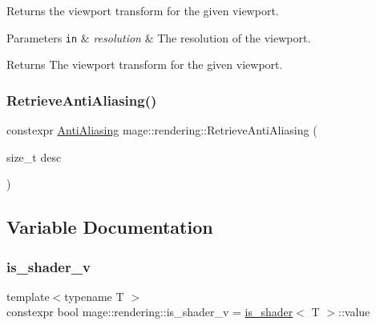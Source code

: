 Returns the viewport transform for the given viewport.


\begin{DoxyParams}[1]{Parameters}
\mbox{\tt in}  & {\em resolution} & The resolution of the viewport. \\
\hline
\end{DoxyParams}
\begin{DoxyReturn}{Returns}
The viewport transform for the given viewport. 
\end{DoxyReturn}
\mbox{\label{namespacemage_1_1rendering_a3e474e8647b074fb13425a24a8354b77}} 
\subsubsection{\texorpdfstring{Retrieve\+Anti\+Aliasing()}{RetrieveAntiAliasing()}}
{\footnotesize\ttfamily constexpr \mbox{\hyperlink{namespacemage_1_1rendering_ac3f75e49e92b42f2f5fb55c450d8899c}{Anti\+Aliasing}} mage\+::rendering\+::\+Retrieve\+Anti\+Aliasing (\begin{DoxyParamCaption}\item[{size\+\_\+t}]{desc }\end{DoxyParamCaption})\hspace{0.3cm}{\ttfamily [noexcept]}}



\subsection{Variable Documentation}
\mbox{\label{namespacemage_1_1rendering_a31fdbf9c96bd42e878e844c2b32b2fb9}} 
\subsubsection{\texorpdfstring{is\+\_\+shader\+\_\+v}{is\_shader\_v}}
{\footnotesize\ttfamily template$<$typename T $>$ \\
constexpr bool mage\+::rendering\+::is\+\_\+shader\+\_\+v = \mbox{\hyperlink{structmage_1_1rendering_1_1is__shader}{is\+\_\+shader}}$<$ T $>$\+::value}

